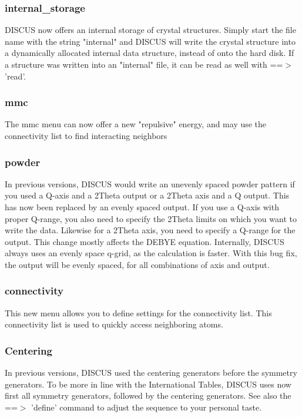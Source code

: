 \subsubsection{internal\_storage}
\par
DISCUS now offers an internal storage of crystal structures. 
Simply start the file name with the string "internal" and 
DISCUS will write the crystal structure into a dynamically 
allocated internal data structure, instead of onto the hard disk. 
If a structure was written into an "internal" file, it can be read 
as well with ==$> $ 'read'. 
\par
\subsubsection{mmc}
\par
The mmc menu can now offer a new "repulsive" energy, and may use 
the connectivity list to find interacting neighbors 
\subsubsection{powder}
\par
In previous versions, DISCUS would write an unevenly spaced powder 
pattern if you used a Q-axis and a 2Theta output or a 2Theta axis 
and a Q output. This has now been replaced by an evenly spaced 
output. 
If you use a Q-axis with proper Q-range, you also need to 
specify the 2Theta limits on which you want to write the data. 
Likewise for a 2Theta axis, you need to specify a Q-range for the 
output. 
This change mostly affects the DEBYE equation. Internally, 
DISCUS always uses an evenly space q-grid, as the calculation is 
faster. With this bug fix, the output will be evenly spaced, for 
all combinations of axis and output. 
\subsubsection{connectivity}
\par
This new menu allows you to define settings for the connectivity 
list. This connectivity list is used to quickly access neighboring 
atoms. 
\subsubsection{Centering}
\par
In previous versions, DISCUS used the centering generators before 
the symmetry generators. 
To be more in line with the International Tables, DISCUS uses now 
first all symmetry generators, followed by the centering generators. 
See also the ==$> $ 'define' command to adjust the sequence to your 
personal taste. 
